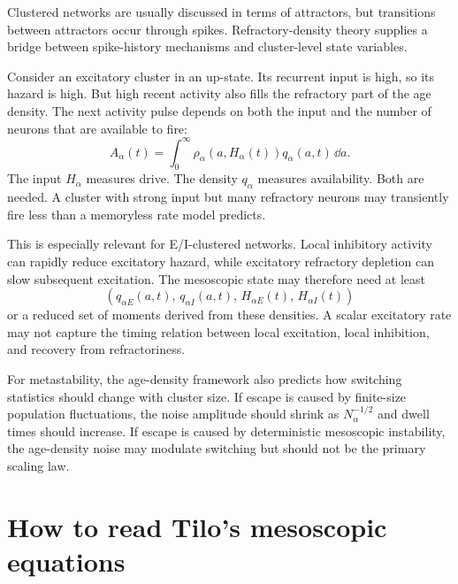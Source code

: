 Clustered networks are usually discussed in terms of attractors, but transitions between attractors occur through spikes. Refractory-density theory supplies a bridge between spike-history mechanisms and cluster-level state variables.

Consider an excitatory cluster in an up-state. Its recurrent input is high, so its hazard is high. But high recent activity also fills the refractory part of the age density. The next activity pulse depends on both the input and the number of neurons that are available to fire:
%
\begin{equation}
  A_\alpha(t)
  =
  \int_0^\infty
  \rho_\alpha(a,H_\alpha(t))q_\alpha(a,t)\,\dd a.
  \label{eq:cluster-activity-availability}
\end{equation}
%
The input $H_\alpha$ measures drive. The density $q_\alpha$ measures availability. Both are needed. A cluster with strong input but many refractory neurons may transiently fire less than a memoryless rate model predicts.

This is especially relevant for E/I-clustered networks. Local inhibitory activity can rapidly reduce excitatory hazard, while excitatory refractory depletion can slow subsequent excitation. The mesoscopic state may therefore need at least
%
\begin{equation}
  \left(q_{\alpha E}(a,t),\,q_{\alpha I}(a,t),\,H_{\alpha E}(t),\,H_{\alpha I}(t)\right)
  \label{eq:ei-age-state}
\end{equation}
%
or a reduced set of moments derived from these densities. A scalar excitatory rate may not capture the timing relation between local excitation, local inhibition, and recovery from refractoriness.

For metastability, the age-density framework also predicts how switching statistics should change with cluster size. If escape is caused by finite-size population fluctuations, the noise amplitude should shrink as $N_\alpha^{-1/2}$ and dwell times should increase. If escape is caused by deterministic mesoscopic instability, the age-density noise may modulate switching but should not be the primary scaling law.

\section{How to read Tilo's mesoscopic equations}
\label{sec:how-to-read-tilos-mesoscopic-equations}


